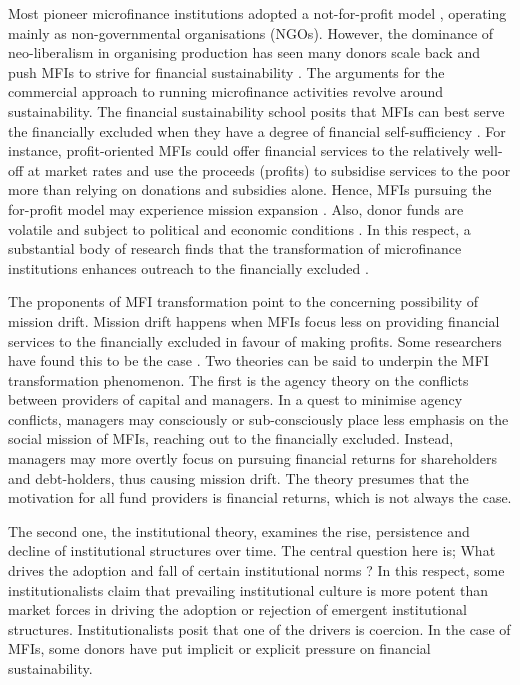 \documentclass[a4paper, nobind]{templates/ociamthesis}
\begin{document}
Most pioneer microfinance institutions adopted a not-for-profit model \autocite{dichter1996questioning}, operating mainly as non-governmental organisations (NGOs). However, the dominance of neo-liberalism in organising production has seen many donors scale back and push MFIs to strive for financial sustainability \autocite{bateman2010doesn}. The arguments for the commercial approach to running microfinance activities revolve around sustainability. The financial sustainability school posits that MFIs can best serve the financially excluded when they have a degree of financial self-sufficiency \autocite{kodongo2013individual}. For instance, profit-oriented MFIs could offer financial services to the relatively well-off at market rates and use the proceeds (profits) to subsidise services to the poor more than relying on donations and subsidies alone. Hence, MFIs pursuing the for-profit model may experience mission expansion \autocite{mersland2010microfinance,louis2013financial}. Also, donor funds are volatile and subject to political and economic conditions \autocite{garmaise2013cheap,d2017aid}. In this respect, a substantial body of research finds that the transformation of microfinance institutions enhances outreach to the financially excluded \autocite{frank2008stemming,gutierrez2009social,mersland2010microfinance,quayes2012depth,mia2017mission,d2013unsubsidized}.

The proponents of MFI transformation point to the concerning possibility of mission drift. Mission drift happens when MFIs focus less on providing financial services to the financially excluded in favour of making profits. Some researchers have found this to be the case \autocite{louis2013financial,bos2015practice,d2013unsubsidized,hartarska2012governance}. Two theories can be said to underpin the MFI transformation phenomenon. The first is the agency theory on the conflicts between providers of capital and managers. In a quest to minimise agency conflicts, managers may consciously or sub-consciously place less emphasis on the social mission of MFIs, reaching out to the financially excluded. Instead, managers may more overtly focus on pursuing financial returns for shareholders and debt-holders, thus causing mission drift. The theory presumes that the motivation for all fund providers is financial returns, which is not always the case.

The second one, the institutional theory, examines the rise, persistence and decline of institutional structures over time. The central question here is; What drives the adoption and fall of certain institutional norms \autocite{powell2012new}? In this respect, some institutionalists claim that prevailing institutional culture is more potent than market forces in driving the adoption or rejection of emergent institutional structures. Institutionalists posit that one of the drivers is coercion. In the case of MFIs, some donors have put implicit or explicit pressure on financial sustainability.
\end{document}
